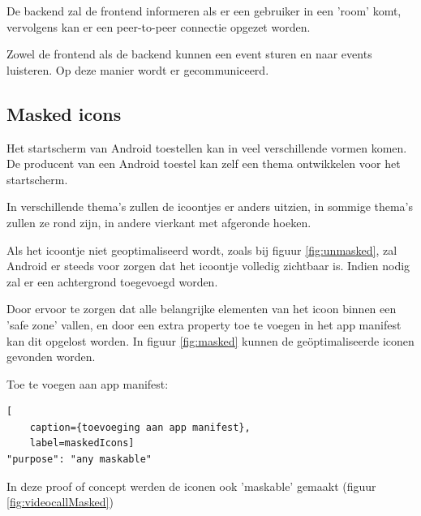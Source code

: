 		De backend zal de frontend informeren als er een gebruiker in een 'room' komt, vervolgens kan er een peer-to-peer connectie opgezet worden.
		
		Zowel de frontend als de backend kunnen een event sturen en naar events luisteren. Op deze manier wordt er gecommuniceerd. 	
		
			
	\subsection{Masked icons}
	
		Het startscherm van Android toestellen kan in veel verschillende vormen komen. De producent van een Android toestel kan zelf een thema ontwikkelen voor het startscherm.
		
		In verschillende thema's zullen de icoontjes er anders uitzien, in sommige thema's zullen ze rond zijn, in andere vierkant met afgeronde hoeken. 
		
		Als het icoontje niet geoptimaliseerd wordt, zoals bij figuur \ref{fig:unmasked}, zal Android er steeds voor zorgen dat het icoontje volledig zichtbaar is. Indien nodig zal er een achtergrond toegevoegd worden.
		
		Door ervoor te zorgen dat alle belangrijke elementen van het icoon binnen een 'safe zone' vallen, en door een extra property toe te voegen in het app manifest kan dit opgelost worden. In figuur \ref{fig:masked} kunnen de geöptimaliseerde iconen gevonden worden.
	
		Toe te voegen aan app manifest:
\begin{lstlisting}[
	caption={toevoeging aan app manifest},
	label=maskedIcons]
"purpose": "any maskable" 
\end{lstlisting}

		In deze proof of concept werden de iconen ook 'maskable' gemaakt (figuur \ref{fig:videocallMasked})

